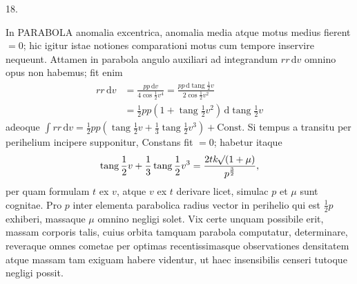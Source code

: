 \begin{center}
\hypertarget{native-036-article018}{}18.
\end{center}
In PARABOLA anomalia excentrica, anomalia media atque motus medius fierent $=0$; hic igitur istae notiones comparationi motus cum tempore inservire nequeunt. Attamen in parabola angulo auxiliari ad integrandum $r r\,\mathrm{d}v$ omnino opus non habemus; fit enim
\[
\begin{aligned}
r r\,\mathrm{d}v&=\frac{p p\,\mathrm{d}v}{4\cos\frac{1}{2}v^4}=\frac{p p\,\mathrm{d}\operatorname{tang}\frac{1}{2}v}{2\cos\frac{1}{2}v^2}\\
&=\frac{1}{2}p p(1+\operatorname{tang}\frac{1}{2}v^2)\,\mathrm{d}\operatorname{tang}\frac{1}{2}v
\end{aligned}
\]
adeoque $\int r r\,\mathrm{d}v=\frac{1}{2}p p(\operatorname{tang}\frac{1}{2}v+\frac{1}{3}\operatorname{tang}\frac{1}{2}v^3)+\mathrm{Const.}$ Si tempus a transitu per perihelium incipere supponitur, Constans fit $=0$; habetur itaque
\[
\operatorname{tang}\frac{1}{2}v+\frac{1}{3}\operatorname{tang}\frac{1}{2}v^3=\frac{2t k\mathord{{}^{}\!\surd}(1+\mu)}{p^{\frac{3}{2}}},
\]
per quam formulam $t$ ex $v$, atque $v$ ex $t$ derivare licet, simulac $p$ et $\mu$ sunt cognitae. Pro $p$ inter elementa parabolica radius vector in perihelio qui est $\frac{1}{2}p$ exhiberi, massaque $\mu$ omnino negligi solet. Vix certe unquam possibile erit, massam corporis talis, cuius orbita tamquam parabola computatur, determinare, reveraque omnes cometae per optimas recentissimasque observationes densitatem atque massam tam exiguam habere videntur, ut haec insensibilis censeri tutoque negligi possit.
